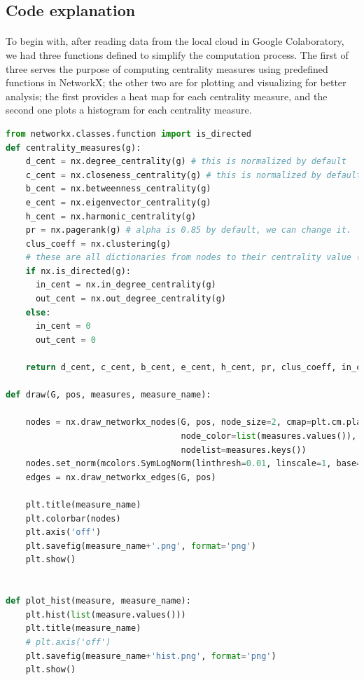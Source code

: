 \documentclass[letterpaper, 11pt]{article}
\newcommand{\1}{\mathds{1}}	%
\theoremstyle{definition}
\begin{document}
\subsection*{Code explanation}

\paragraph{}To begin with, after reading data from the local cloud in Google Colaboratory, we had three functions defined to simplify the computation process. The first of three serves the purpose of computing centrality measures using predefined functions in NetworkX; the other two are for plotting and visualizing for better analysis; the first provides a heat map for each centrality measure, and the second one plots a histogram for each centrality measure.

\begin{lstlisting}[language=python, caption={Functions for future computations}, label={lst:Pycode}]
from networkx.classes.function import is_directed
def centrality_measures(g):
    d_cent = nx.degree_centrality(g) # this is normalized by default
    c_cent = nx.closeness_centrality(g) # this is normalized by default
    b_cent = nx.betweenness_centrality(g)
    e_cent = nx.eigenvector_centrality(g)
    h_cent = nx.harmonic_centrality(g)
    pr = nx.pagerank(g) # alpha is 0.85 by default, we can change it.
    clus_coeff = nx.clustering(g)
    # these are all dictionaries from nodes to their centrality value (or other variables).
    if nx.is_directed(g):
      in_cent = nx.in_degree_centrality(g)
      out_cent = nx.out_degree_centrality(g)
    else:
      in_cent = 0
      out_cent = 0
      
    return d_cent, c_cent, b_cent, e_cent, h_cent, pr, clus_coeff, in_cent, out_cent

def draw(G, pos, measures, measure_name):
    
    nodes = nx.draw_networkx_nodes(G, pos, node_size=2, cmap=plt.cm.plasma, 
                                   node_color=list(measures.values()),
                                   nodelist=measures.keys())
    nodes.set_norm(mcolors.SymLogNorm(linthresh=0.01, linscale=1, base=10))
    edges = nx.draw_networkx_edges(G, pos)

    plt.title(measure_name)
    plt.colorbar(nodes)
    plt.axis('off')
    plt.savefig(measure_name+'.png', format='png')
    plt.show()


def plot_hist(measure, measure_name):
    plt.hist(list(measure.values()))
    plt.title(measure_name)
    # plt.axis('off')
    plt.savefig(measure_name+'hist.png', format='png')
    plt.show()\end{lstlisting}
\newpage
\end{document}
